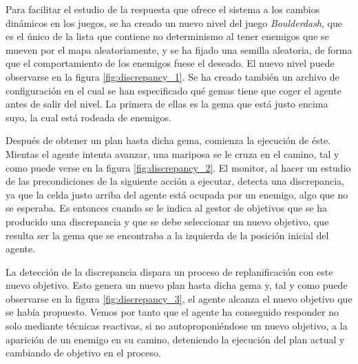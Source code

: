 Para facilitar el estudio de la respuesta que ofrece el sistema a los cambios dinámicos en
los juegos, se ha creado un nuevo nivel del juego \textit{Boulderdash}, que es el
único de la lista que contiene no determinismo al tener enemigos que se mueven por el mapa
aleatoriamente, y se ha fijado una semilla aleatoria, de forma que el comportamiento de los enemigos
fuese el deseado. El nuevo nivel puede observarse en la figura \ref{fig:discrepancy_1}. Se ha creado
también un archivo de configuración en el cual se han especificado qué gemas tiene que coger
el agente antes de salir del nivel. La primera de ellas es la gema que está justo encima suyo,
la cual está rodeada de enemigos.

Después de obtener un plan hasta dicha gema, comienza la ejecución de éste. Mientas el agente
intenta avanzar, una mariposa se le cruza en el camino, tal y como puede verse en la figura
\ref{fig:discrepancy_2}. El monitor, al hacer un estudio de las precondiciones de la siguiente
acción a ejecutar, detecta una discrepancia, ya que la celda justo arriba del agente está
ocupada por un enemigo, algo que no se esperaba. Es entonces cuando se le indica al gestor
de objetivos que se ha producido una discrepancia y que se debe seleccionar un nuevo objetivo,
que resulta ser la gema que se encontraba a la izquierda de la posición inicial del agente.

La detección de la discrepancia dispara un proceso de replanificación con este nuevo objetivo. Esto genera
un nuevo plan hasta dicha gema y, tal y como puede observarse en la figura \ref{fig:discrepancy_3},
el agente alcanza el nuevo objetivo que se había propuesto. Vemos por tanto que el agente ha conseguido
responder no solo mediante técnicas reactivas, si no autoproponiéndose un nuevo objetivo, a la aparición
de un enemigo en su camino, deteniendo la ejecución del plan actual y cambiando de objetivo en el proceso.

